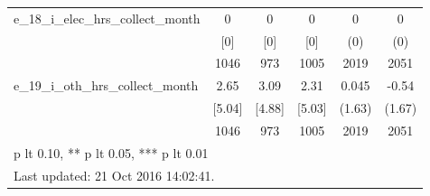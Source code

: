 \begin{table}[htbp]
\begin{tabular*}{0.9\hsize}{@{\hskip\tabcolsep\extracolsep\fill}l*{1}{ccccc}}
e\_18\_i\_elec\_hrs\_collect\_month   &        0&        0&        0&        0         &        0         \\
                                &      [0]&      [0]&      [0]&      (0)         &      (0)         \\
                                &     1046&      973&     1005&     2019         &     2051         \\
e\_19\_i\_oth\_hrs\_collect\_month    &     2.65&     3.09&     2.31&    0.045         &    -0.54         \\
                                &   [5.04]&   [4.88]&   [5.03]&   (1.63)         &   (1.67)         \\
                                &     1046&      973&     1005&     2019         &     2051         \\
\bottomrule
\multicolumn{6}{l}{\footnotesize * p lt 0.10, ** p lt 0.05, *** p lt 0.01}\\
\multicolumn{6}{l}{\footnotesize Last updated: 21 Oct 2016 14:02:41.}\\
\end{tabular*}
\end{table}
